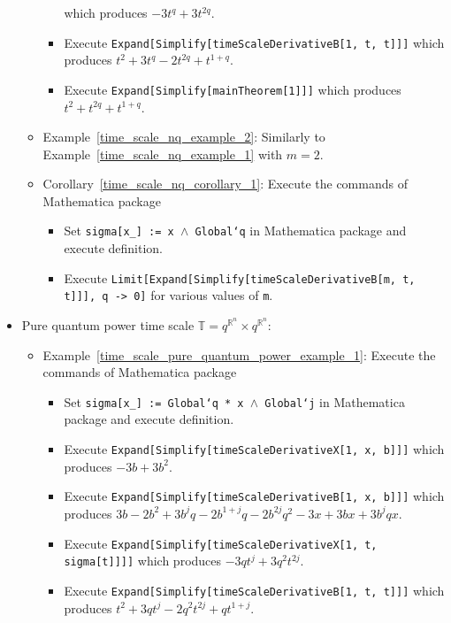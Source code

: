 \begin{itemize}
\begin{itemize}
\begin{itemize}
            which produces $-3 t^q + 3 t^{2 q}$.
            \item Execute \texttt{Expand[Simplify[timeScaleDerivativeB[1, t, t]]]}
            which produces $t^2 + 3 t^q - 2 t^{2 q} + t^{1 + q}$.
            \item Execute \texttt{Expand[Simplify[mainTheorem[1]]]} which produces $t^2 + t^{2 q} + t^{1 + q}$.
        \end{itemize}
        \item Example~\ref{time_scale_nq_example_2}: Similarly to Example~\ref{time_scale_nq_example_1} with $m=2$.
        \item Corollary~\ref{time_scale_nq_corollary_1}:
        Execute the commands of Mathematica package
        \begin{itemize}
            \item Set \texttt{sigma[x\_] := x $\wedge$ Global`q} in Mathematica package and execute definition.
            \item Execute \texttt{Limit[Expand[Simplify[timeScaleDerivativeB[m, t, t]]], q -> 0]} for various
            values of \texttt{m}.
        \end{itemize}
    \end{itemize}
    \item Pure quantum power time scale $\mathbb{T} = q^{\mathbb{R}^n} \times q^{\mathbb{R}^n}$:
    \begin{itemize}
        \item Example~\ref{time_scale_pure_quantum_power_example_1}:
        Execute the commands of Mathematica package
        \begin{itemize}
            \item Set \texttt{sigma[x\_] := Global`q * x $\wedge$ Global`j} in Mathematica package and execute definition.
            \item Execute \texttt{Expand[Simplify[timeScaleDerivativeX[1, x, b]]]}
            which produces $-3 b + 3 b^2$.
            \item Execute \texttt{Expand[Simplify[timeScaleDerivativeB[1, x, b]]]}
            which produces $3 b - 2 b^2 + 3 b^j q - 2 b^{1 + j} q - 2 b^{2 j} q^2 - 3 x + 3 b x +
            3 b^j q x$.
            \item Execute \texttt{Expand[Simplify[timeScaleDerivativeX[1, t, sigma[t]]]]}
            which produces $-3 q t^j + 3 q^2 t^{2 j}$.
            \item Execute \texttt{Expand[Simplify[timeScaleDerivativeB[1, t, t]]]}
            which produces $t^2 + 3 q t^j - 2 q^2 t^{2 j} + q t^{1 + j}$.

\end{itemize}
\end{itemize}
\end{itemize}
